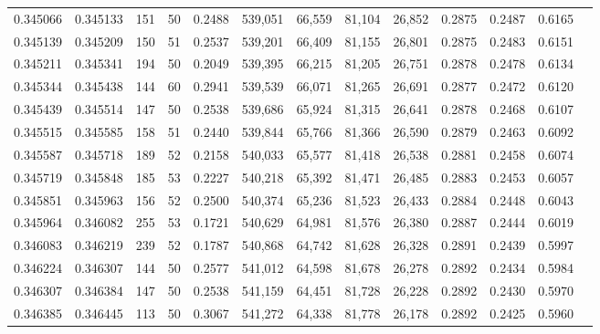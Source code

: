 \begin{tabular}{rrrrrrrrrrrrr}
0.345066 & 0.345133 &   151 &  50 &                                     0.2488 & 539,051 &  66,559 &  81,104 &  26,852 & 0.2875 & 0.2487 & 0.6165 \\
0.345139 & 0.345209 &   150 &  51 &                                     0.2537 & 539,201 &  66,409 &  81,155 &  26,801 & 0.2875 & 0.2483 & 0.6151 \\
0.345211 & 0.345341 &   194 &  50 &                                     0.2049 & 539,395 &  66,215 &  81,205 &  26,751 & 0.2878 & 0.2478 & 0.6134 \\
0.345344 & 0.345438 &   144 &  60 &                                     0.2941 & 539,539 &  66,071 &  81,265 &  26,691 & 0.2877 & 0.2472 & 0.6120 \\
0.345439 & 0.345514 &   147 &  50 &                                     0.2538 & 539,686 &  65,924 &  81,315 &  26,641 & 0.2878 & 0.2468 & 0.6107 \\
0.345515 & 0.345585 &   158 &  51 &                                     0.2440 & 539,844 &  65,766 &  81,366 &  26,590 & 0.2879 & 0.2463 & 0.6092 \\
0.345587 & 0.345718 &   189 &  52 &                                     0.2158 & 540,033 &  65,577 &  81,418 &  26,538 & 0.2881 & 0.2458 & 0.6074 \\
0.345719 & 0.345848 &   185 &  53 &                                     0.2227 & 540,218 &  65,392 &  81,471 &  26,485 & 0.2883 & 0.2453 & 0.6057 \\
0.345851 & 0.345963 &   156 &  52 &                                     0.2500 & 540,374 &  65,236 &  81,523 &  26,433 & 0.2884 & 0.2448 & 0.6043 \\
0.345964 & 0.346082 &   255 &  53 &                                     0.1721 & 540,629 &  64,981 &  81,576 &  26,380 & 0.2887 & 0.2444 & 0.6019 \\
0.346083 & 0.346219 &   239 &  52 &                                     0.1787 & 540,868 &  64,742 &  81,628 &  26,328 & 0.2891 & 0.2439 & 0.5997 \\
0.346224 & 0.346307 &   144 &  50 &                                     0.2577 & 541,012 &  64,598 &  81,678 &  26,278 & 0.2892 & 0.2434 & 0.5984 \\
0.346307 & 0.346384 &   147 &  50 &                                     0.2538 & 541,159 &  64,451 &  81,728 &  26,228 & 0.2892 & 0.2430 & 0.5970 \\
0.346385 & 0.346445 &   113 &  50 &                                     0.3067 & 541,272 &  64,338 &  81,778 &  26,178 & 0.2892 & 0.2425 & 0.5960 \\

\end{tabular}
